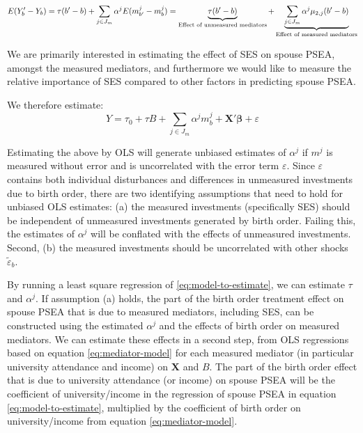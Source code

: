 \documentclass[
]{article}
\theoremstyle{definition}
\theoremstyle{definition}
\theoremstyle{definition}
\theoremstyle{definition}
\theoremstyle{remark}
\begin{document}
\begin{equation}
\label{eq:decomposition}
E(Y_b' - Y_b) = \tau(b' - b) + \sum_{j \in J_m} \alpha^j E(m^j_{b'} - m^j_b) \\
=\underbrace{\tau(b' - b)}_{\text{Effect of unmeasured mediators}} + \underbrace{\sum_{j \in J_m} \alpha^j \mu_{2,j} (b' - b)}_{\text{Effect of measured mediators}}
\end{equation}

We are primarily interested in estimating the effect of SES on spouse PSEA,
amongst the measured mediators, and furthermore we would like to measure the
relative importance of SES compared to other factors in predicting spouse PSEA.

We therefore estimate:
\begin{equation}
\label{eq:model-to-estimate}
Y = \tau_0 + \tau B + \sum_{j \in J_m} \alpha^j m^j_b + \mathbf{X'} \symbf{\beta} + \varepsilon
\end{equation}

Estimating the above by OLS will generate unbiased estimates of
\(\alpha^j\) if \(m^j\) is measured without error and is
uncorrelated with the error term \(\varepsilon\). Since
\(\varepsilon\) contains both individual disturbances and differences
in unmeasured investments due to birth order, there are two identifying assumptions that need to hold for unbiased OLS estimates: (a) the measured investments
(specifically SES) should be independent of unmeasured investments
generated by birth order. Failing this, the estimates of \(\alpha^j\) will be
conflated with the effects of unmeasured investments. Second, (b) the measured
investments should be uncorrelated with other shocks \(\tilde{\varepsilon}_b\).

By running a least square regression of \eqref{eq:model-to-estimate}, we can
estimate \(\tau\) and \(\alpha^j\). If assumption (a) holds, the part of the birth
order treatment effect on spouse PSEA that is due to measured mediators,
including SES, can be constructed using the estimated \(\alpha^j\) and the effects
of birth order on measured mediators. We can estimate these effects in a second
step, from OLS regressions based on equation \eqref{eq:mediator-model} for each
measured mediator (in particular university attendance and income) on
\(\mathbf{X}\) and \(B\). The part of the birth order effect that is due to
university attendance (or income) on spouse PSEA will be the coefficient of
university/income in the regression of spouse PSEA in equation
\eqref{eq:model-to-estimate}, multiplied by the coefficient of birth order on
university/income from equation \eqref{eq:mediator-model}.
\end{document}
